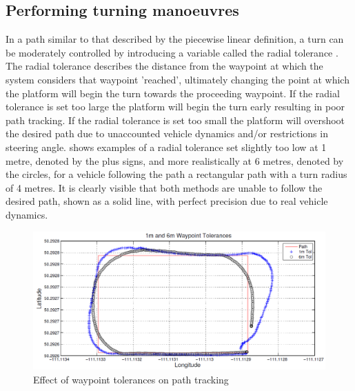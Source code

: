 \documentclass[main.tex]{subfiles}
\begin{document}
\subsection{Performing turning manoeuvres}
In a path similar to that described by the piecewise linear definition, a turn can be moderately controlled by introducing a variable called the radial tolerance \parencite{Giesbrecht2005}. The radial tolerance describes the distance from the waypoint at which the system considers that waypoint 'reached', ultimately changing the point at which the platform will begin the turn towards the proceeding waypoint. If the radial tolerance is set too large the platform will begin the turn early resulting in poor path tracking. If the radial tolerance is set too small the platform will overshoot the desired path due to unaccounted vehicle dynamics and/or restrictions in steering angle.  shows examples of a radial tolerance set slightly too low at 1 metre, denoted by the plus signs, and more realistically at 6 metres, denoted by the circles, for a vehicle following the path a rectangular path with a turn radius of 4 metres. It is clearly visible that both methods are unable to follow the desired path, shown as a solid line, with perfect precision due to real vehicle dynamics.
\begin{figure}[ht]
\includegraphics[width=\textwidth]{2-LiteratureReview/waypointTolerances.PNG}
\centering
\caption[Effect of waypoint tolerances on path tracking]{Effect of waypoint tolerances on path tracking \parencite{Giesbrecht2005}} 
\end{figure}
\end{document}
